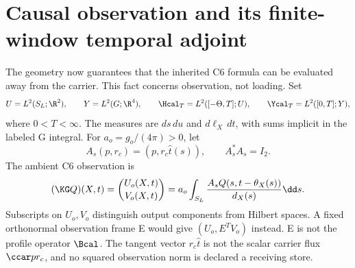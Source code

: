 \section{Causal observation and its finite-window temporal adjoint}\label{sec:observation}
The geometry now guarantees that the inherited C6 formula can be evaluated away from the carrier. This fact concerns observation, not loading. Set
\begin{equation}\label{eq:spaces}
U=L^2(S_L;\R^2),\qquad Y=L^2(G;\R^4),\qquad
\Hcal_T=L^2([-\Theta,T];U),\qquad \Ycal_T=L^2([0,T];Y),
\end{equation}
where $0<T<\infty$. The measures are $ds\,du$ and $d\ell_X\,dt$, with sums implicit in the labeled G integral. For $a_o=g_o/(4\pi)>0$, let
\begin{equation}\label{eq:As}
A_s(p,r_c)=(p,r_c\hat t(s)),\qquad A_s^*A_s=I_2.
\end{equation}
The ambient C6 observation is~\cite{CCcarrier}
\begin{equation}\label{eq:C6}
(\KG Q)(X,t)=\binom{U_o(X,t)}{V_o(X,t)}
=a_o\int_{S_L}\frac{A_sQ(s,t-\theta_X(s))}{d_X(s)}\dd s.
\end{equation}
Subscripts on $U_o,V_o$ distinguish output components from Hilbert spaces. A fixed orthonormal observation frame E would give $(U_o,E^TV_o)$ instead. E is not the profile operator $\Bcal$. The tangent vector $r_c\hat t$ is not the scalar carrier flux $\ccar p r_c$, and no squared observation norm is declared a receiving store.

